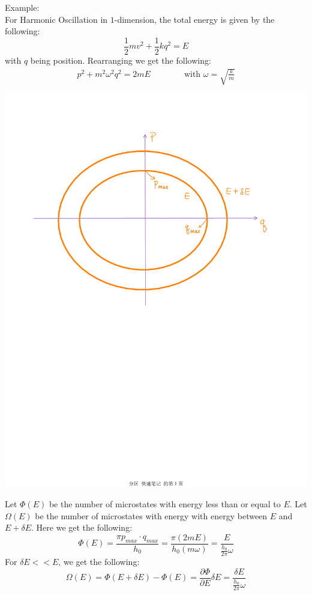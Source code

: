 \documentclass[11pt]{article}
\theoremstyle{break}
\theoremstyle{break}
\newcommand{\pd}{\partial}
\newcommand{\example}{\color{green}Example: \color{black}}
\begin{document}
\example\\
For Harmonic Oscillation in $1$-dimension, the total energy is given by the following:\\
$$\frac{1}{2}mv^2 + \frac{1}{2}kq^2 = E$$
with $q$ being position. Rearranging we get the following:
\begin{align*}
p^2 + m^2 \omega^2 q^2 = 2mE \qquad\qquad\text{with }\omega = \sqrt{\frac{k}{m}}
\end{align*}
\begin{center}
\includegraphics[scale=0.5]{pqPhaseSpace.pdf}
\end{center}
Let $\Phi(E)$ be the number of microstates with energy less than or equal to $E$. Let $\Omega(E)$ be the number of microstates with energy with energy between $E$ and $E+\delta E$. Here we get the following:
$$\Phi(E) = \frac{\pi p_{max} \cdot q_{max}}{h_0} = \frac{\pi (2mE)}{h_0(m\omega)} = \frac{E}{\frac{h_0}{2\pi} \omega}$$
For $\delta E << E$, we get the following:
$$\Omega(E) = \Phi(E+\delta E) - \Phi(E) = \frac{\partial \Phi}{\pd E}\delta E = \frac{\delta E}{\frac{h_0}{2\pi}\omega}$$
\end{document}
